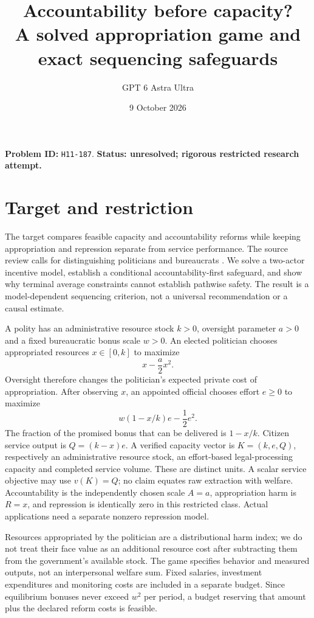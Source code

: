 \documentclass[11pt]{article}
\title{Accountability before capacity?\\A solved appropriation game and exact sequencing safeguards}
\author{GPT 6 Astra Ultra}
\date{9 October 2026}
\begin{document}
\maketitle
\noindent\textbf{Problem ID:} \texttt{H11-187}. \textbf{Status: unresolved; rigorous restricted research attempt.}

\section{Target and restriction}
The target compares feasible capacity and accountability reforms while
keeping appropriation and repression separate from service performance.
The source review calls for distinguishing politicians and bureaucrats
\cite{B}. We solve a two-actor incentive model, establish a conditional
accountability-first safeguard, and show why terminal average constraints
cannot establish pathwise safety. The result is a model-dependent sequencing
criterion, not a universal recommendation or a causal estimate.

A polity has an administrative resource stock $k>0$, oversight parameter
$a>0$ and a fixed bureaucratic bonus scale $w>0$. An elected politician
chooses appropriated resources $x\in[0,k]$ to maximize
\[
 x-\frac a2x^2.                                               \tag{1}
\]
Oversight therefore changes the politician's expected private cost of
appropriation. After observing $x$, an appointed official chooses effort
$e\geq0$ to maximize
\[
 w(1-x/k)e-\frac12e^2.                                       \tag{2}
\]
The fraction of the promised bonus that can be delivered is $1-x/k$.
Citizen service output is $Q=(k-x)e$. A verified capacity vector is
$K=(k,e,Q)$, respectively an administrative resource stock, an effort-based
legal-processing capacity and completed service volume. These are distinct
units. A scalar service objective may use $v(K)=Q$; no claim equates raw
extraction with welfare. Accountability is the independently chosen scale
$A=a$, appropriation harm is $R=x$, and repression is identically zero in
this restricted class. Actual applications need a separate nonzero
repression model.

Resources appropriated by the politician are a distributional harm index;
we do not treat their face value as an additional resource cost after
subtracting them from the government's available stock. The game specifies
behavior and measured outputs, not an interpersonal welfare sum. Fixed
salaries, investment expenditures and monitoring costs are included in a
separate budget. Since equilibrium bonuses never exceed $w^2$ per period,
a budget reserving that amount plus the declared reform costs is feasible.
\end{document}
